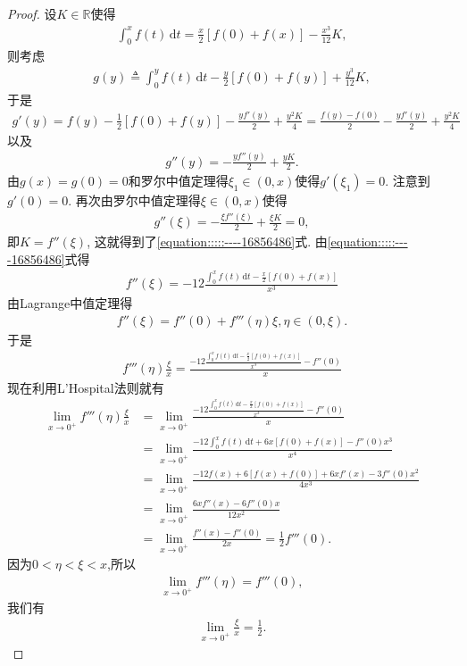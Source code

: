 \documentclass[../../main.tex]{subfiles}
\begin{document}
\begin{proof}
设$K \in \mathbb{R}$使得
\begin{align*}
\int_0^x f(t) \,\mathrm{d}t = \frac{x}{2}[f(0) + f(x)] - \frac{x^3}{12}K,
\end{align*}
则考虑
\begin{align*}
g(y) \triangleq \int_0^y f(t) \,\mathrm{d}t - \frac{y}{2}[f(0) + f(y)] + \frac{y^3}{12}K,
\end{align*}
于是
\begin{align*}
g'(y) = f(y) - \frac{1}{2}[f(0) + f(y)] - \frac{y f'(y)}{2} + \frac{y^2 K}{4} = \frac{f(y) - f(0)}{2} - \frac{y f'(y)}{2} + \frac{y^2 K}{4}
\end{align*}
以及
\begin{align*}
g''(y) = -\frac{y f''(y)}{2} + \frac{y K}{2}.
\end{align*}
由$g(x) = g(0) = 0$和罗尔中值定理得$\xi_1 \in (0,x)$使得$g'(\xi_1) = 0$. 注意到$g'(0) = 0$. 再次由罗尔中值定理得$\xi \in (0,x)$使得
\begin{align*}
g''(\xi) = -\frac{\xi f''(\xi)}{2} + \frac{\xi K}{2} = 0,
\end{align*}
即$K = f''(\xi)$, 这就得到了\eqref{equation:::::----16856486}式.
由\eqref{equation:::::----16856486}式得
\begin{align*}
f''(\xi) = -12 \frac{\int_0^x f(t) \,\mathrm{d}t - \frac{x}{2}[f(0) + f(x)]}{x^3}
\end{align*}
由Lagrange中值定理得
\begin{align*}
f''(\xi) = f''(0) + f'''(\eta) \xi, \eta \in (0,\xi).
\end{align*}
于是
\begin{align*}
f'''(\eta) \frac{\xi}{x} = \frac{-12 \frac{\int_0^x f(t) \,\mathrm{d}t - \frac{x}{2}[f(0) + f(x)]}{x^3} - f''(0)}{x}
\end{align*}
现在利用L'Hospital法则就有
\begin{align*}
\lim_{x \to 0^+} f'''(\eta) \frac{\xi}{x} &= \lim_{x \to 0^+} \frac{-12 \frac{\int_0^x f(t) \,\mathrm{d}t - \frac{x}{2}[f(0) + f(x)]}{x^3} - f''(0)}{x} \\
&= \lim_{x \to 0^+} \frac{-12 \int_0^x f(t) \,\mathrm{d}t + 6x [f(0) + f(x)] - f''(0) x^3}{x^4} \\
&= \lim_{x \to 0^+} \frac{-12 f(x) + 6 [f(x) + f(0)] + 6x f'(x) - 3 f''(0) x^2}{4x^3} \\
&= \lim_{x \to 0^+} \frac{6x f''(x) - 6 f''(0) x}{12x^2} \\
&= \lim_{x \to 0^+} \frac{f''(x) - f''(0)}{2x} = \frac{1}{2} f'''(0).
\end{align*}
因为$0<\eta<\xi<x$,所以
\begin{align*}
\lim_{x \to 0^+} f'''(\eta) = f'''(0),
\end{align*}
我们有
\begin{align*}
\lim_{x \to 0^+} \frac{\xi}{x} = \frac{1}{2}.
\end{align*}
\end{proof}
\end{document}
